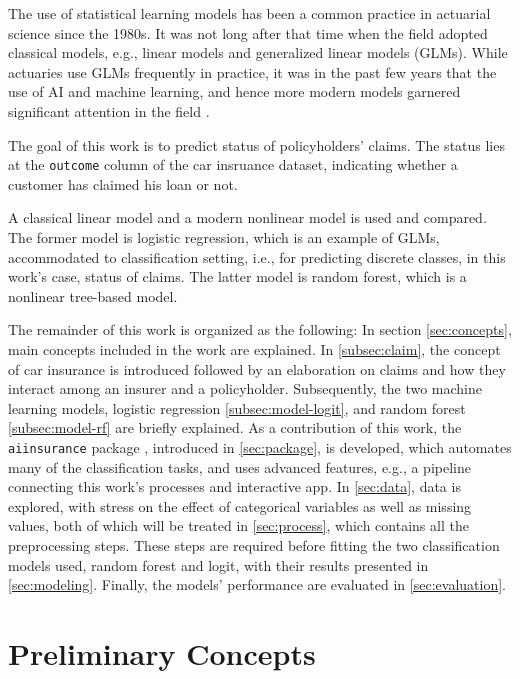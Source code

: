 \documentclass{article}
\begin{document}
The use of statistical learning models has been a common practice in
actuarial science since the 1980s. It was not long after that time when
the field adopted classical models, e.g., linear models and generalized
linear models (GLMs). While actuaries use GLMs frequently in practice,
it was in the past few years that the use of AI and machine learning,
and hence more modern models garnered significant attention in the field
\cite{rev1}.

The goal of this work is to predict status of policyholders' claims. The
status lies at the \texttt{outcome} column of the car insruance dataset,
indicating whether a customer has claimed his loan or not.

A classical linear model and a modern nonlinear model is used and
compared. The former model is logistic regression, which is an example
of GLMs, accommodated to classification setting, i.e., for predicting
discrete classes, in this work's case, status of claims. The latter
model is random forest, which is a nonlinear tree-based model.

The remainder of this work is organized as the following: In section
\ref{sec:concepts}, main concepts included in the work are explained. In
\ref{subsec:claim}, the concept of car insurance is introduced followed
by an elaboration on claims and how they interact among an insurer and a
policyholder. Subsequently, the two machine learning models, logistic
regression \ref{subsec:model-logit}, and random forest
\ref{subsec:model-rf} are briefly explained. As a contribution of this
work, the \texttt{aiinsurance} package \cite{package}, introduced in
\ref{sec:package}, is developed, which automates many of the
classification tasks, and uses advanced features, e.g., a pipeline
connecting this work's processes and interactive app. In \ref{sec:data},
data is explored, with stress on the effect of categorical variables as
well as missing values, both of which will be treated in
\ref{sec:process}, which contains all the preprocessing steps. These
steps are required before fitting the two classification models used,
random forest and logit, with their results presented in
\ref{sec:modeling}. Finally, the models' performance are evaluated in
\ref{sec:evaluation}.

\newpage

\hypertarget{preliminary-concepts}{%
\section{\texorpdfstring{Preliminary Concepts
\label{sec:concepts}}{Preliminary Concepts }}\label{preliminary-concepts}}
\end{document}
